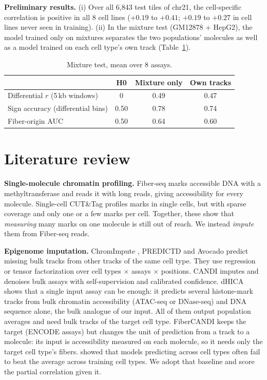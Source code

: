 \documentclass[acmtog,nonacm]{acmart}   %
\begin{document}
\textbf{Preliminary results.} (i) Over all 6,843 test tiles of chr21, the cell-specific
correlation is positive in all 8 cell lines ($+0.19$ to $+0.41$; $+0.19$ to $+0.27$
in cell lines never seen in training). (ii) In the mixture test (GM12878 + HepG2), the model
trained only on mixtures separates the two populations' molecules as well as a model
trained on each cell type's own track (Table~\ref{tab:t3}).

\begin{table}[h]
\caption{Mixture test, mean over 8 assays.}
\label{tab:t3}
\small
\begin{tabular}{lccc}
\toprule
 & H0 & Mixture only & Own tracks \\
\midrule
Differential $r$ (5\,kb windows) & 0 & 0.49 & 0.47 \\
Sign accuracy (differential bins) & 0.50 & 0.78 & 0.74 \\
Fiber-origin AUC & 0.50 & 0.64 & 0.60 \\
\bottomrule
\end{tabular}
\end{table}

\section{Literature review}

\textbf{Single-molecule chromatin profiling.} Fiber-seq \citep{Stergachis20} marks
accessible DNA with a methyltransferase and reads it with long reads, giving accessibility
for every molecule. Single-cell CUT\&Tag \citep{Bartosovic21} profiles marks in single
cells, but with sparse coverage and only one or a few marks per cell. Together, these
show that \emph{measuring} many marks on one molecule is still out of reach. We instead
\emph{impute} them from Fiber-seq reads.

\textbf{Epigenome imputation.} ChromImpute \citep{Ernst15}, PREDICTD \citep{Durham18}
and Avocado \citep{Schreiber20Avocado} predict missing bulk tracks from other tracks
of the same cell type. They use regression or tensor factorization over cell types
$\times$ assays $\times$ positions. CANDI \citep{Foroozandeh25} imputes and denoises
bulk assays with self-supervision and calibrated confidence. dHICA \citep{Wen24} shows
that a single input assay can be enough: it predicts several histone-mark tracks from
bulk chromatin accessibility (ATAC-seq or DNase-seq) and DNA sequence alone, the bulk
analogue of our input. All of them output population averages and need bulk tracks of
the target cell type. FiberCANDI keeps the target (ENCODE assays) but changes the unit
of prediction from a track to a molecule: its input is accessibility measured on each
molecule, so it needs only the target cell type's fibers. \citet{Schreiber20Pitfall}
showed that models predicting across cell types often fail to beat the average across
training cell types. We adopt that baseline and score the partial correlation given it.
\end{document}
